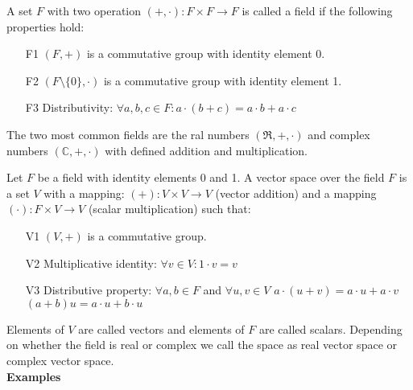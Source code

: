 	\begin{definition}
		A set $F$ with two operation $ (+ , \cdot) : F \times F \rightarrow F$ is called a field if the following properties hold: 
	\end{definition}
	
	\begin{itemize}
		\item[F1] $ (F, +) $ is a commutative group with identity element 0.
		\item[F2] $(F \setminus\{0\}, \cdot)$ is a commutative group with identity element 1. 
		\item[F3] Distributivity:  $\forall a, b, c \in F: a \cdot (b + c) = a \cdot b + a \cdot c$
	\end{itemize}

	The two most common fields are the ral numbers $(\Re, +, \cdot)$ and complex numbers $(\mathbb{C}, +, \cdot)$ with defined addition and multiplication.
	
	\begin{definition}
		Let $F$ be a field with identity elements 0 and 1. A vector space over the field $F$ is a set $V$ with a mapping: $ (+) : V \times V \rightarrow V$ (vector addition)  and a mapping $(\cdot) : F \times V \rightarrow V$ (scalar multiplication) such that: 
	\end{definition}

	\begin{itemize}
		\item[V1] $(V, +)$ is a commutative group.
		\item[V2] Multiplicative identity: $\forall v \in V: 1 \cdot v = v$
		\item[V3] Distributive property: $\forall a, b  \in F$ and $ \forall u, v \in V$
			\subitem $a \cdot (u + v) = a \cdot u + a \cdot v$
			\subitem $(a + b)u = a \cdot u + b \cdot u $ 	
	\end{itemize}

	Elements of $V$ are called vectors and elements of $F$ are called scalars. Depending on whether the field is real or complex we call the space as real vector space or complex vector space. \\
	
	\textbf{Examples}
	
